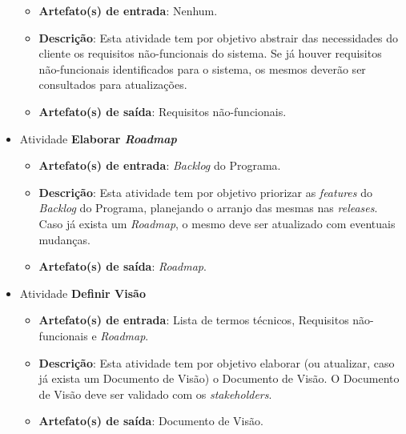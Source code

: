 \begin{itemize}
	  \begin{itemize}
	    \item \textbf{Artefato(s) de entrada}: Nenhum.
	    
	    \item \textbf{Descrição}: Esta atividade tem por objetivo abstrair das necessidades do cliente os
	      requisitos não-funcionais do sistema. Se já houver requisitos não-funcionais identificados para o sistema,
	      os mesmos deverão ser consultados para atualizações.
	    
	    \item \textbf{Artefato(s) de saída}: Requisitos não-funcionais.
		  
	  \end{itemize}
	  
     \item Atividade \textbf{Elaborar \textit{Roadmap}}
      
	  \begin{itemize}
	    \item \textbf{Artefato(s) de entrada}: \textit{Backlog} do Programa.
	    
	    \item \textbf{Descrição}: Esta atividade tem por objetivo priorizar as \textit{features} do
	      \textit{Backlog} do Programa, planejando o arranjo das mesmas nas \textit{releases}.  Caso já exista
	      um \textit{Roadmap}, o mesmo deve ser atualizado com eventuais mudanças.
	    
	    \item \textbf{Artefato(s) de saída}: \textit{Roadmap}.
		  
	  \end{itemize}
	  
     \item Atividade \textbf{Definir Visão}
      
	  \begin{itemize}
	    \item \textbf{Artefato(s) de entrada}: Lista de termos técnicos, Requisitos não-funcionais e \textit{Roadmap}.
	    
	    \item \textbf{Descrição}: Esta atividade tem por objetivo elaborar (ou atualizar, caso já exista um
	      Documento de Visão) o Documento de Visão. O Documento de Visão deve ser validado com os \textit{stakeholders}.
	    
	    \item \textbf{Artefato(s) de saída}: Documento de Visão.
		  

\end{itemize}
\end{itemize}
